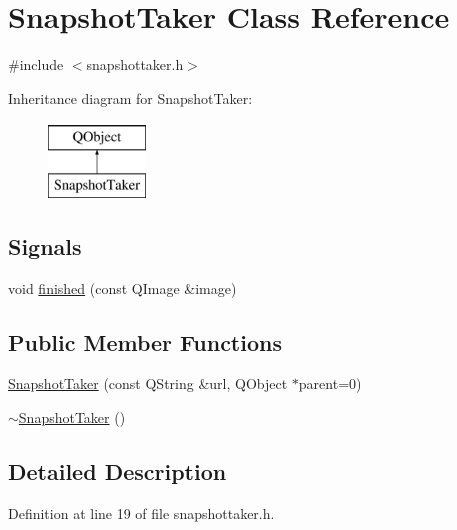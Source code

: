 \hypertarget{classSnapshotTaker}{\section{Snapshot\+Taker Class Reference}
\label{classSnapshotTaker}
}


{\ttfamily \#include $<$snapshottaker.\+h$>$}

Inheritance diagram for Snapshot\+Taker\+:\begin{figure}[H]
\begin{center}
\leavevmode
\includegraphics[height=2.000000cm]{classSnapshotTaker}
\end{center}
\end{figure}
\subsection*{Signals}
\begin{DoxyCompactItemize}
\item 
void \hyperlink{classSnapshotTaker_a3949cbd9645f69ede299f2669c941c77}{finished} (const Q\+Image \&image)
\end{DoxyCompactItemize}
\subsection*{Public Member Functions}
\begin{DoxyCompactItemize}
\item 
\hyperlink{classSnapshotTaker_a17bea62f0975929918257fb330ccc058}{Snapshot\+Taker} (const Q\+String \&url, Q\+Object $\ast$parent=0)
\item 
\hyperlink{classSnapshotTaker_a8afcc766c51bbac04c01a5f32a6fc21f}{$\sim$\+Snapshot\+Taker} ()
\end{DoxyCompactItemize}


\subsection{Detailed Description}


Definition at line 19 of file snapshottaker.\+h.



